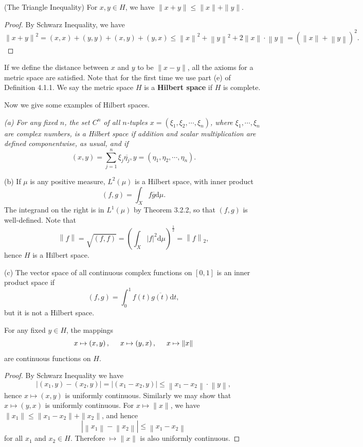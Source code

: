 \begin{theorem}(The Triangle Inequality)
For $x,y\in H$, we have $\|x+y\|\le\|x\|+\|y\|$.
\end{theorem}
\begin{proof}
By Schwarz Inequality, we have 
$$
\left\| x+y \right\| ^2=\left( x,x \right) +\left( y,y \right) +\left( x,y \right) +\left( y,x \right) \le \left\| x \right\| ^2+\left\| y \right\| ^2+2\left\| x \right\| \cdot \left\| y \right\| =\left( \left\| x \right\| +\left\| y \right\| \right) ^2.
$$
\end{proof}
If we define the distance between $x$ and $y$ to be $\|x-y\|$, all the axioms for a metric space are satisfied. Note that for the first time we use part (e) of Definition 4.1.1. We say the metric space $H$ is a \textbf{Hilbert space} if $H$ is complete.\par
Now we give some examples of Hilbert spaces.
\begin{example}\em
(a) For any fixed $n$, the set $C^n$ of all $n$-tuples $x=(\xi_1,\xi_2,\cdots,\xi_n)$, where $\xi_1,\cdots,\xi_n$ are complex numbers, is a Hilbert space if addition and scalar multiplication are defined componentwise, as usual, and if 
$$
\left( x,y \right) =\sum_{j=1}^n{\xi _j\overline{\eta _j}},y=\left( \eta _1,\eta _2,\cdots ,\eta _n \right) .
$$\par
(b) If $\mu$ is any positive measure, $L^2(\mu)$ is a Hilbert space, with inner product 
$$
\left( f,g \right) =\int_X{f\overline{g}\mathrm{d}\mu}.
$$
The integrand on the right is in $L^1(\mu)$ by Theorem 3.2.2, so that $(f,g)$ is well-defined. Note that 
$$
\left\| f \right\| =\sqrt{\left( f,f \right)}=\left( \int_X{\left| f \right|^2\mathrm{d}\mu} \right) ^{\frac{1}{2}}=\left\| f \right\| _2,
$$
hence $H$ is a Hilbert space.\par
(c) The vector space of all continuous complex functions on $[0,1]$ is an inner product space if 
$$
\left( f,g \right) =\int_0^1{f\left( t \right) \overline{g\left( t \right) }\mathrm{d}t},
$$
but it is not a Hilbert space.
\end{example}
\begin{theorem}
For any fixed $y\in H$, the mappings 
$$
x\mapsto \left( x,y \right) ,\hspace{0.5cm}x\mapsto \left( y,x \right) ,\hspace{0.5cm}x\mapsto \left\| x \right\| 
$$
are continuous functions on $H$.
\end{theorem}
\begin{proof}
By Schwarz Inequality we have 
$$
\left| \left( x_1,y \right) -\left( x_2,y \right) \right|=\left| \left( x_1-x_2,y \right) \right|\le \left\| x_1-x_2 \right\| \cdot \left\| y \right\| ,
$$
hence $x\mapsto(x,y)$ is uniformly continuous. Similarly we may show that $x\mapsto(y,x)$ is uniformly continuous. For $x\mapsto\|x\|$, we have $\|x_1\|\le\|x_1-x_2\|+\|x_2\|$, and hence 
$$
\left| \left\| x_1 \right\| -\left\| x_2 \right\| \right|\le \left\| x_1-x_2 \right\| 
$$
for all $x_1$ and $x_2\in H$. Therefore $\mapsto\|x\|$ is also uniformly continuous.
\end{proof}
